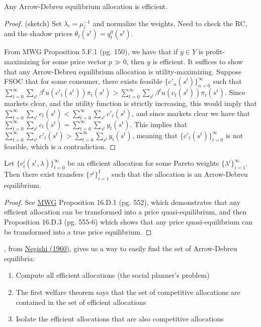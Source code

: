 \documentclass[10pt]{article}
\begin{document}
\begin{theorem}\label{thm:first_welfare}
	 Any Arrow-Debreu equilibrium allocation is efficient.
\end{theorem}
\begin{proof}
	(sketch) Set $\lambda_i = \mu_i^{-1}$ and normalize the weights. Need to check the RC, and the shadow prices $\theta_t(s^t) = q_t^0(s^t)$.
	
	From MWG Proposition 5.F.1 (pg. 150), we have that if $y \in Y$ is profit-maximizing for some price vector $p \gg 0$, then $y$ is efficient. It suffices to show that any Arrow-Debreu equilibrium allocation is utility-maximizing. Suppose FSOC that for some consumer, there exists feasible $\{c'_n(s^t)\}_{n=0}^\infty$ such that $\sum_{t=0}^\infty \sum_{s^t} \beta^t u(c'_t(s^t))\pi_t(s^t) > \sum_{t=0}^\infty \sum_{s^t} \beta^t u(c_t(s^t))\pi_t(s^t)$. Since markets clear, and the utility function is strictly increasing, this would imply that $\sum_{t=0}^\infty \sum_{s^t} c_t(s^t) < \sum_{t=0}^\infty \sum_{s^t} c'_t(s^t)$, and since markets clear we have that $\sum_{t=0}^\infty \sum_{s^t} c_t(s^t) = \sum_{t=0}^\infty \sum_{s^t} y_t(s^t)$. This implies that $\sum_{t=0}^\infty \sum_{s^t} c'_t(s^t) > \sum_{t=0}^\infty \sum_{s^t} y_t(s^t)$, meaning that $\{c'_t(s^t)\}_{t=0}^\infty$ is not feasible, which is a contradiction.
\end{proof}

\begin{theorem}\label{thm:second_welfare}
	 Let $\{c_t^i(s^t,\lambda)\}_{t=0}^\infty$ be an efficient allocation for some Pareto weights $\{\lambda^i\}_{i=1}^\infty$. Then there exist transfers $\{\tau^i\}_{i=1}^I$ such that the allocation is an Arrow-Debreu equilibrium.
\end{theorem}
\begin{proof}
	See \href{https://global.oup.com/academic/product/microeconomic-theory-9780195073409?cc=us&lang=en&}{MWG} Proposition 16.D.1 (pg. 552), which demonstrates that any efficient allocation can be transformed into a price quasi-equilibrium, and then Proposition 16.D.3 (pg. 555-6) which shows that any price quasi-equilibrium can be transformed into a true price equilibrium. 
\end{proof}

\begin{definition}
	, from \href{https://onlinelibrary.wiley.com/doi/10.1111/j.1467-999X.1960.tb00275.x}{Negishi (1960)}, gives us a way to easily find the set of Arrow-Debreu equilibria:
	\begin{enumerate}
		\item Compute all efficient allocations (the social planner's problem)
		\item The first welfare theorem says that the set of competitive allocations are contained in the set of efficient allocations
		\item Isolate the efficient allocations that are also competitive allocations
	\end{enumerate}
\end{definition}
\end{document}

